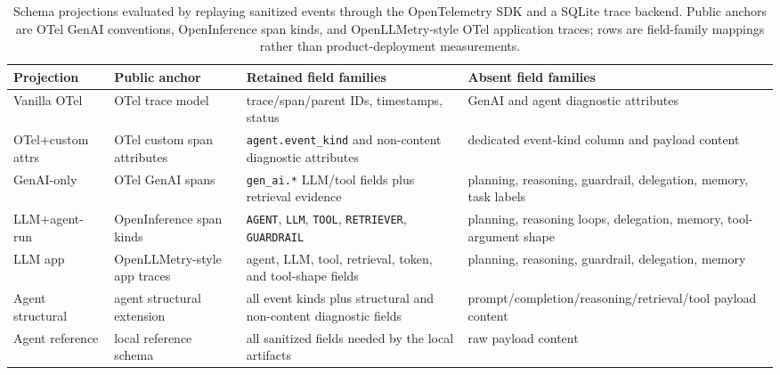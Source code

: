 \documentclass[conference]{IEEEtran}
\begin{document}
\begin{table}[t]
\centering
\scriptsize
\caption{Schema projections evaluated by replaying sanitized events
through the OpenTelemetry SDK and a SQLite trace backend. Public anchors
are OTel GenAI conventions, OpenInference span kinds, and
OpenLLMetry-style OTel application traces; rows are field-family
mappings rather than product-deployment measurements.}
\label{tab:projections}
\begin{tabular}{@{}p{}p{}p{}p{}@{}}
\toprule
Projection & Public anchor & Retained field families & Absent field families \\
\midrule
Vanilla OTel & OTel trace model & trace/span/parent IDs, timestamps, status & GenAI and agent diagnostic attributes \\
OTel+custom attrs & OTel custom span attributes & \texttt{agent.event\_kind} and non-content diagnostic attributes & dedicated event-kind column and payload content \\
GenAI-only & OTel GenAI spans & \texttt{gen\_ai.*} LLM/tool fields plus retrieval evidence & planning, reasoning, guardrail, delegation, memory, task labels \\
LLM+agent-run & OpenInference span kinds & \texttt{AGENT}, \texttt{LLM}, \texttt{TOOL}, \texttt{RETRIEVER}, \texttt{GUARDRAIL} & planning, reasoning loops, delegation, memory, tool-argument shape \\
LLM app & OpenLLMetry-style app traces & agent, LLM, tool, retrieval, token, and tool-shape fields & planning, reasoning, guardrail, delegation, memory \\
Agent structural & agent structural extension & all event kinds plus structural and non-content diagnostic fields & prompt/completion/reasoning/retrieval/tool payload content \\
Agent reference & local reference schema & all sanitized fields needed by the local artifacts & raw payload content \\
\bottomrule
\end{tabular}
\end{table}
\end{document}
